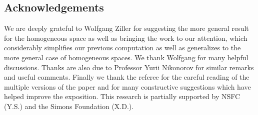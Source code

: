 \documentclass[10pt,a4paper]{amsart}
\begin{document}
\subsection*{Acknowledgements}

We are deeply grateful to Wolfgang Ziller for suggesting the more general result for the homogeneous space as well as bringing the work \cite{12} to our attention, which considerably simplifies our previous computation as well as generalizes to the more general case of homogeneous spaces. We thank Wolfgang for many helpful discussions. Thanks are also due to Professor Yurii Nikonorov for similar remarks and useful comments. Finally we thank the referee for the careful reading of the multiple versions of the paper and for many constructive suggestions which have helped improve the exposition. This research is partially supported by NSFC (Y.S.) and the Simons Foundation (X.D.).

\end{document}
